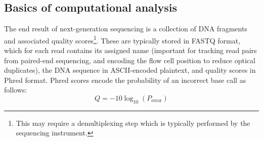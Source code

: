 \subsection{Basics of computational analysis}
The end result of next-generation sequencing is a collection of DNA fragments and associated quality scores\footnote{This may require a demultiplexing step which is typically performed by the sequencing instrument.}. These are typically stored in FASTQ format, which for each read contains its assigned name (important for tracking read pairs from paired-end sequencing, and encoding the flow cell position to reduce optical duplicates), the DNA sequence in ASCII-encoded plaintext, and quality scores in Phred format. Phred scores \cite{ewing1998} encode the probability of an incorrect base call as follows:
\begin{equation}
     Q = -10\log_{10}(P_{\text{error}})
\end{equation}

